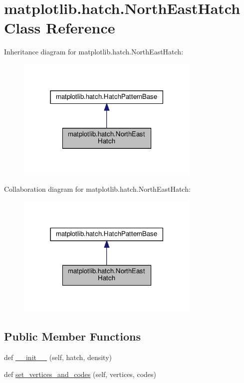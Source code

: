 \hypertarget{classmatplotlib_1_1hatch_1_1NorthEastHatch}{}\section{matplotlib.\+hatch.\+North\+East\+Hatch Class Reference}
\label{classmatplotlib_1_1hatch_1_1NorthEastHatch}


Inheritance diagram for matplotlib.\+hatch.\+North\+East\+Hatch\+:
\nopagebreak
\begin{figure}[H]
\begin{center}
\leavevmode
\includegraphics[width=249pt]{classmatplotlib_1_1hatch_1_1NorthEastHatch__inherit__graph}
\end{center}
\end{figure}


Collaboration diagram for matplotlib.\+hatch.\+North\+East\+Hatch\+:
\nopagebreak
\begin{figure}[H]
\begin{center}
\leavevmode
\includegraphics[width=249pt]{classmatplotlib_1_1hatch_1_1NorthEastHatch__coll__graph}
\end{center}
\end{figure}
\subsection*{Public Member Functions}
\begin{DoxyCompactItemize}
\item 
def \hyperlink{classmatplotlib_1_1hatch_1_1NorthEastHatch_a1c5bf6f620b8c7a0745620b7d4ffde8b}{\+\_\+\+\_\+init\+\_\+\+\_\+} (self, hatch, density)
\item 
def \hyperlink{classmatplotlib_1_1hatch_1_1NorthEastHatch_a688a9d91ae963438923ad63fed10a583}{set\+\_\+vertices\+\_\+and\+\_\+codes} (self, vertices, codes)
\end{DoxyCompactItemize}
